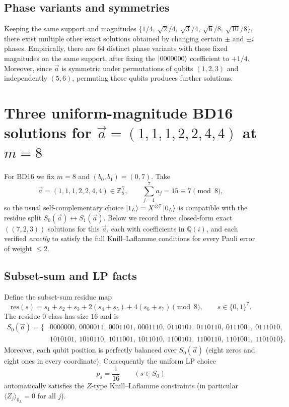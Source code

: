 \documentclass[11pt]{article}
\begin{document}
\subsection{Phase variants and symmetries}
Keeping the same support and magnitudes
\(\{1/4,\ \sqrt2/4,\ \sqrt3/4,\ \sqrt6/8,\ \sqrt{10}/8\}\),
there exist multiple other exact solutions obtained by changing certain \(\pm\) and \(\pm i\) phases.
Empirically, there are \(64\) distinct phase variants with these fixed magnitudes on the same support,
after fixing the \(\ket{0000000}\) coefficient to \(+1/4\).
Moreover, since \(\vec a\) is symmetric under permutations of qubits \((1,2,3)\) and independently \((5,6)\),
permuting those qubits produces further solutions.

\section{Three uniform-magnitude BD16 solutions for \texorpdfstring{$\vec a=(1,1,1,2,2,4,4)$}{a=(1,1,1,2,2,4,4)} at \texorpdfstring{$m=8$}{m=8}}

For BD16 we fix \(m=8\) and \((b_0,b_1)=(0,7)\).
Take
\[
\vec a=(1,1,1,2,2,4,4)\in \mathbb{Z}_8^{\,7},
\qquad
\sum_{j=1}^7 a_j = 15 \equiv 7 \pmod 8,
\]
so the usual self-complementary choice \(\ket{1_L}=X^{\otimes 7}\ket{0_L}\) is compatible with the residue split
\(S_0(\vec a)\leftrightarrow S_1(\vec a)\).
Below we record three closed-form exact \(((7,2,3))\) solutions for this \(\vec a\), each with coefficients in \(\mathbb{Q}(i)\),
and each verified \emph{exactly} to satisfy the full Knill--Laflamme conditions for every Pauli error of weight \(\le 2\).

\subsection{Subset-sum and LP facts}
Define the subset-sum residue map
\[
\mathrm{res}(s)=s_1+s_2+s_3+2(s_4+s_5)+4(s_6+s_7)\pmod 8,
\qquad s\in\{0,1\}^7.
\]
The residue-\(0\) class has size \(16\) and is
\[
\begin{aligned}
S_0(\vec a)=\{&
0000000,\ 0000011,\ 0001101,\ 0001110,\ 
0110101,\ 0110110,\ 0111001,\ 0111010,\\
&1010101,\ 1010110,\ 1011001,\ 1011010,\ 
1100101,\ 1100110,\ 1101001,\ 1101010
\}.
\end{aligned}
\]
Moreover, each qubit position is perfectly balanced over \(S_0(\vec a)\) (eight zeros and eight ones in every coordinate).
Consequently the uniform LP choice
\[
p_s=\frac{1}{16}\qquad (s\in S_0)
\]
automatically satisfies the \(Z\)-type Knill--Laflamme constraints (in particular \(\langle Z_j\rangle_{0_L}=0\) for all \(j\)).
\end{document}

